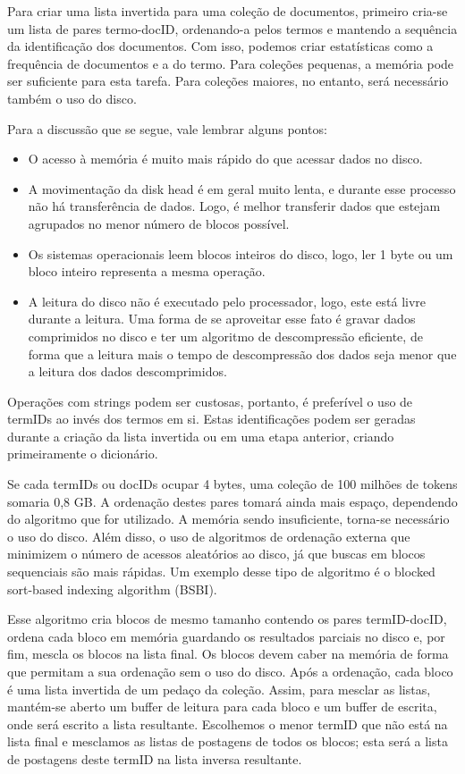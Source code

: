 Para criar uma lista invertida para uma coleção de documentos, primeiro cria-se um lista de pares termo-docID, ordenando-a pelos termos e mantendo a sequência da identificação dos documentos. Com isso, podemos criar estatísticas como a frequência de documentos e a do termo. Para coleções pequenas, a memória pode ser suficiente para esta tarefa. Para coleções maiores, no entanto, será necessário também o uso do disco.

Para a discussão que se segue, vale lembrar alguns pontos:
\begin{itemize}
\item O acesso à memória é muito mais rápido do que acessar dados no disco.
\item A movimentação da disk head é em geral muito lenta, e durante esse processo não há transferência de dados. Logo, é melhor transferir dados que estejam agrupados no menor número de blocos possível.
\item Os sistemas operacionais leem blocos inteiros do disco, logo, ler 1 byte ou um bloco inteiro representa a mesma operação.
\item A leitura do disco não é executado pelo processador, logo, este está livre durante a leitura. Uma forma de se aproveitar esse fato é gravar dados comprimidos no disco e ter um algoritmo de descompressão eficiente, de forma que a leitura mais o tempo de descompressão dos dados seja menor que a leitura dos dados descomprimidos.
\end{itemize}


Operações com strings podem ser custosas, portanto, é preferível o uso de termIDs ao invés dos termos em si. Estas identificações podem ser geradas durante a criação da lista invertida ou em uma etapa anterior, criando primeiramente o dicionário.

Se cada termIDs ou docIDs ocupar 4 bytes, uma coleção de 100 milhões de tokens somaria 0,8 GB. A ordenação destes pares tomará ainda mais espaço, dependendo do algoritmo que for utilizado. A memória sendo insuficiente, torna-se necessário o uso do disco. Além disso, o uso de algoritmos de ordenação externa que minimizem o número de acessos aleatórios ao disco, já que buscas em blocos sequenciais são mais rápidas. Um exemplo desse tipo de algoritmo é o blocked sort-based indexing algorithm (BSBI). 

Esse algoritmo cria blocos de mesmo tamanho contendo os pares termID-docID, ordena cada bloco em memória guardando os resultados parciais no disco e, por fim, mescla os blocos na lista final. Os blocos devem caber na memória de forma que permitam a sua ordenação sem o uso do disco. Após a ordenação, cada bloco é uma lista invertida de um pedaço da coleção. Assim, para mesclar as listas, mantém-se aberto um buffer de leitura para cada bloco e um buffer de escrita, onde será escrito a lista resultante. Escolhemos o menor termID que não está na lista final e mesclamos as listas de postagens de todos os blocos; esta será a lista de postagens deste termID na lista inversa resultante. 

